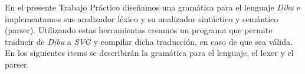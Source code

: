 En el presente Trabajo Práctico diseñamos una gramática para el lenguaje \textit{Dibu} e implementamos sus analizador
léxico y su analizador sintáctico y semántico (parser). Utilizando estas herramientas creamos un programa que permite
traducir de \textit{Dibu} a \textit{SVG} y compilar dicha traducción, en caso de que sea válida. En los siguientes items
se describirán la gramática para el lenguaje, el lexer y el parser.
